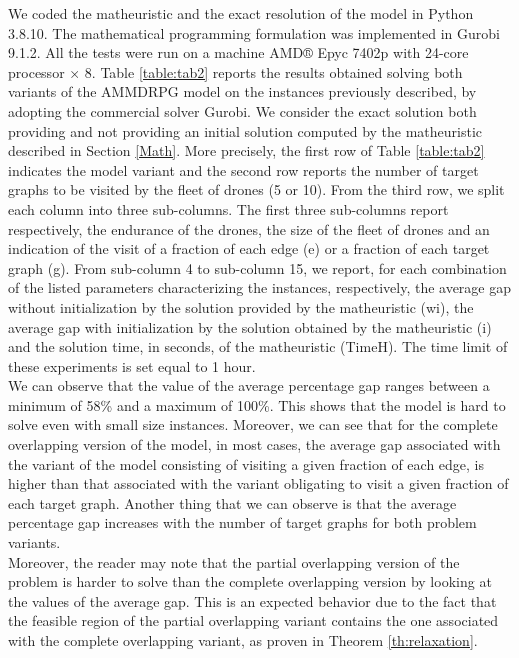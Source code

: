 \documentclass[10pt,a4paper]{elsarticle}
\def\AMD{{\sf AMMDRPG\xspace}}
\newcommand{\EN}[1]{{\color{black}#1}}
\begin{document}
\noindent
We coded the matheuristic and the exact resolution of the model in Python 3.8.10. The mathematical programming formulation \EN{was} implemented in Gurobi 9.1.2. All the tests \EN{were} run on a machine AMD® Epyc 7402p with 24-core processor × 8.
Table \ref{table:tab2} reports the results obtained solving both variants of the \AMD\xspace model on the instances previously described, by adopting the commercial solver Gurobi. We consider the exact solution both providing and not providing an initial solution computed by the matheuristic described in Section \ref{Math}. More precisely, the first row of Table \ref{table:tab2} indicates the model variant and the second row reports the number of target graphs to be visited by the fleet of drones (5 or 10). From the third row, we split each column in\EN{to} three sub-columns. The first three sub-columns report respectively, the endurance of the drones, the size of the fleet of drones and \EN{an} indication \EN{of} the visit of a fraction of each edge (e) or a fraction of each target graph (g). From sub-column 4 to sub-column 15, we report, for each combination of the listed parameters characterizing the instances, respectively, the average gap without initialization by the solution provided by the matheuristic (wi), the average gap with initialization by the solution obtained by the matheuristic (i) and the solution time, in seconds, of the matheuristic (TimeH). The time limit of these experiments is set equal to 1 hour.\\
\noindent
We can observe that the value of the average percentage gap ranges between a minimum of 58\% and a maximum of 100\%. This shows that the model is hard \EN{to solve} even with small size instances. Moreover, we can see that for the complete overlapping version of the model, in most cases, the average gap associated with the variant of the model consisting \EN{of} visiting a given fraction of each edge, is higher than \EN{that} associated with the variant \EN{obligating} to visit a given fraction of each target graph. 
Another thing that we can observe is that the average percentage gap increases with the number of target graphs for both problem variants.\\
\noindent
Moreover, the reader may note that the partial overlapping version of the problem is harder to solve than the complete overlapping version by looking at the values of the average gap. This is an expected \EN{behavior} due to the fact that the feasible region of the partial overlapping variant contains the one associated with the complete overlapping variant, as proven in Theorem \ref{th:relaxation}. 
\end{document}
